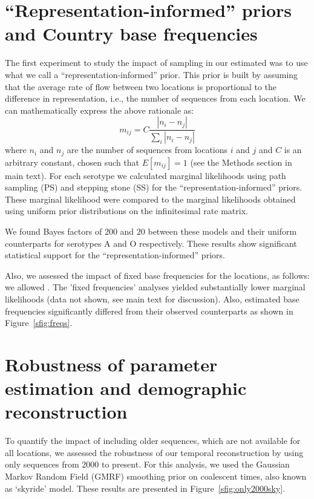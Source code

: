 \documentclass[a4paper,10pt]{article}
\begin{document}
\section{``Representation-informed'' priors and Country base frequencies}
The first experiment to study the impact of sampling in our estimated was to use what we call a ``representation-informed'' prior.
This prior is built by assuming that the average rate of flow between two locations is proportional to the difference in representation, i.e., the number of sequences from each location.
We can mathematically express the above rationale as:
\begin{equation}
\label{seq:repprior}
 m_{ij}=C\frac{|n_i-n_j|}{\sum_i|n_i-n_j|}
\end{equation}
where $n_i$ and $n_j$ are the number of sequences from locations $i$ and $j$ and $C$ is an arbitrary constant, chosen such that $E[m_{ij}]=1$ (see the Methods section in main text).
For each serotype we calculated marginal likelihoods using path sampling (PS) and stepping stone (SS) for the ``representation-informed'' priors.
These marginal likelihood were compared to the marginal likelihoods obtained using uniform prior distributions on the infinitesimal rate matrix.

We found Bayes factors of $200$ and $20$ between these models and their uniform counterparts for serotypes A and O respectively.
These results show significant statistical support for the ``representation-informed'' priors.

Also, we assessed the impact of fixed base frequencies for the locations, as follows: we allowed .
The 'fixed frequencies' analyses yielded substantially lower marginal likelihoods (data not shown, see main text for discussion).
Also, estimated base frequencies significantly differed from their observed counterparts as shown in Figure~\ref{sfig:freqs}.

\section{Robustness of parameter estimation and demographic reconstruction}

To quantify the impact of including older sequences, which are not available for all locations, we assessed the robustness of our temporal reconstruction by using only sequences from 2000 to present.
For this analysis, we used the Gaussian Markov Random Field (GMRF) smoothing prior on coalescent times, also known as `skyride' model.
These results are presented in Figure~\ref{sfig:only2000sky}.
\end{document}
